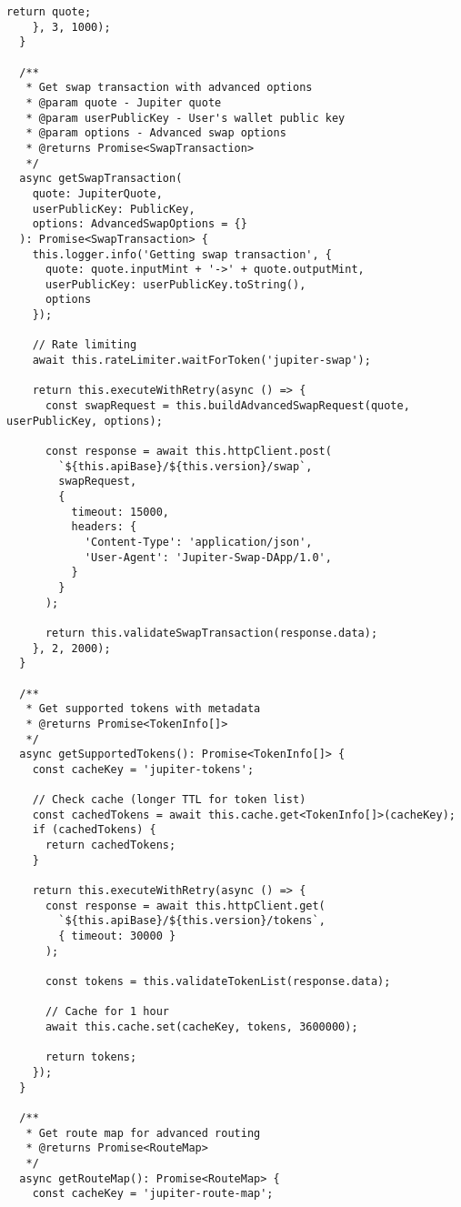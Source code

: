 \documentclass[11pt,a4paper]{article}
\begin{document}
\begin{lstlisting}[style=typescript, caption=Advanced Jupiter API v6 Service]
      return quote;
    }, 3, 1000);
  }

  /**
   * Get swap transaction with advanced options
   * @param quote - Jupiter quote
   * @param userPublicKey - User's wallet public key
   * @param options - Advanced swap options
   * @returns Promise<SwapTransaction>
   */
  async getSwapTransaction(
    quote: JupiterQuote,
    userPublicKey: PublicKey,
    options: AdvancedSwapOptions = {}
  ): Promise<SwapTransaction> {
    this.logger.info('Getting swap transaction', { 
      quote: quote.inputMint + '->' + quote.outputMint,
      userPublicKey: userPublicKey.toString(),
      options 
    });

    // Rate limiting
    await this.rateLimiter.waitForToken('jupiter-swap');

    return this.executeWithRetry(async () => {
      const swapRequest = this.buildAdvancedSwapRequest(quote, userPublicKey, options);
      
      const response = await this.httpClient.post(
        `${this.apiBase}/${this.version}/swap`,
        swapRequest,
        {
          timeout: 15000,
          headers: {
            'Content-Type': 'application/json',
            'User-Agent': 'Jupiter-Swap-DApp/1.0',
          }
        }
      );

      return this.validateSwapTransaction(response.data);
    }, 2, 2000);
  }

  /**
   * Get supported tokens with metadata
   * @returns Promise<TokenInfo[]>
   */
  async getSupportedTokens(): Promise<TokenInfo[]> {
    const cacheKey = 'jupiter-tokens';
    
    // Check cache (longer TTL for token list)
    const cachedTokens = await this.cache.get<TokenInfo[]>(cacheKey);
    if (cachedTokens) {
      return cachedTokens;
    }

    return this.executeWithRetry(async () => {
      const response = await this.httpClient.get(
        `${this.apiBase}/${this.version}/tokens`,
        { timeout: 30000 }
      );

      const tokens = this.validateTokenList(response.data);
      
      // Cache for 1 hour
      await this.cache.set(cacheKey, tokens, 3600000);
      
      return tokens;
    });
  }

  /**
   * Get route map for advanced routing
   * @returns Promise<RouteMap>
   */
  async getRouteMap(): Promise<RouteMap> {
    const cacheKey = 'jupiter-route-map';
    

\end{lstlisting}
\end{document}
